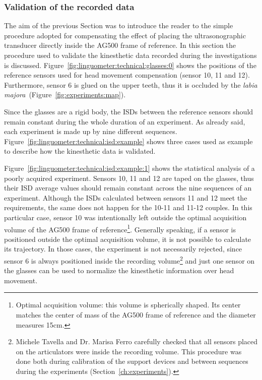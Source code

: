 \subsubsection{Validation of the recorded data}
The aim of the previous Section was to introduce the reader to the simple
procedure adopted for compensating the effect of placing the ultrasonographic
transducer directly inside the AG500 frame of reference.
In this section the procedure used to validate the 
kinesthetic data recorded during the investigations is discussed.
Figure~\ref{fig:linguometer:technical:glasses:0} shows  the positions of the
reference sensors used for head movement compensation (sensor 10, 11 and 12).
Furthermore, sensor 6 is glued on the upper teeth, thus it is occluded by the 
\emph{labia majora}~(Figure~\ref{fig:experiments:map}).


Since the glasses are a rigid body, the ISDs between the reference
sensors should remain constant during the whole duration of an experiment.
As already said, each experiment is made up by nine different sequences. 
Figure~\ref{fig:linguometer:technical:isd:example} shows three cases used as
example to describe how the kinesthetic data is validated.


Figure~\ref{fig:linguometer:technical:isd:example:1} shows the statistical
analysis of a poorly acquired experiment.
Sensors 10, 11 and 12 are taped on the glasses, thus their ISD average values 
should remain constant across the nine sequences of an experiment.
Although the ISDs calculated between sensors 11 and 12 meet the requirements,
the same does not happen for the 10-11 and 11-12 couples.
In this particular case, sensor 10 was intentionally left outside the optimal 
acquisition volume of the AG500 frame of
reference\footnote{Optimal acquisition volume: this volume
is spherically shaped. Its center matches the center of mass of the
AG500 frame of reference and the diameter measures 15cm.}.
Generally speaking, if a sensor is positioned outside the optimal acquisition
volume, it is not possible to calculate its trajectory.
In those cases, the experiment is not necessarily rejected, since sensor 6 is
always positioned inside the recording 
volume\footnote{Michele Tavella and Dr. Marisa Ferro carefully checked that all
sensors placed on the articulators were inside the recording volume.
This procedure was done both during calibration of the support devices and
between sequences during the experiments (Section~\ref{ch:experiments}).}
and just one sensor on the glasses can be used to normalize the kinesthetic 
information over head movement.

